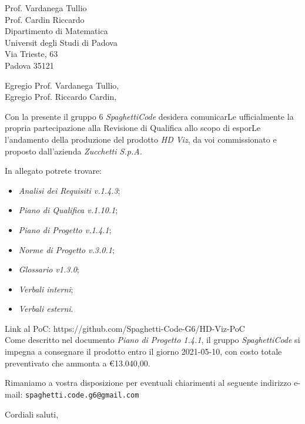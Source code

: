 \documentclass[a4paper,12pt]{letteracdp}
\date{16 giugno 2021}
\begin{document}
\begin{letter}{
\vspace*{-2\baselineskip}
Prof. Vardanega Tullio \\
Prof. Cardin Riccardo \\
Dipartimento di Matematica \\
Universit degli Studi di Padova \\
Via Trieste, 63 \\
Padova 35121}

\opening{Egregio Prof. Vardanega Tullio, \\
\noindent Egregio Prof. Riccardo Cardin,}

\begin{flushleft}
Con la presente il gruppo 6 \textit{SpaghettiCode} desidera comunicarLe ufficialmente la propria partecipazione alla Revisione di 
Qualifica allo scopo di esporLe l'andamento della produzione del prodotto \textit{HD Viz}, da voi commissionato e proposto 
dall'azienda \textit{Zucchetti S.p.A.}

In allegato potrete trovare:
\end{flushleft}

\begin{itemize}
\item \emph{Analisi dei Requisiti v.1.4.3};
\item \emph{Piano di Qualifica v.1.10.1};
\item \emph{Piano di Progetto v.1.4.1};
\item \emph{Norme di Progetto v.3.0.1};
\item \emph{Glossario v1.3.0};
\item \emph{Verbali interni};
\item \emph{Verbali esterni}.
\end{itemize}

\begin{flushleft}
Link al PoC: https://github.com/Spaghetti-Code-G6/HD-Viz-PoC \\
Come descritto nel documento \emph{Piano di Progetto 1.4.1}, il gruppo \textit{SpaghettiCode} si impegna a consegnare il prodotto entro il 
giorno 2021-05-10, con costo totale preventivato che ammonta a \euro{13.040,00}.

Rimaniamo a vostra disposizione per eventuali chiarimenti al seguente indirizzo e-mail: {\texttt{spaghetti.code.g6@gmail.com}}
\end{flushleft}

\closing{Cordiali saluti,}

\end{letter}
\end{document}
